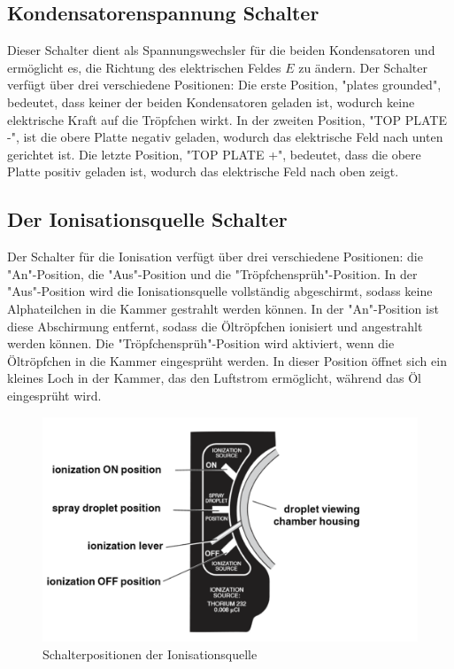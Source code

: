 \subsection{Kondensatorenspannung Schalter}\label{sub:Spannungsschalter}
Dieser Schalter dient als Spannungswechsler für die beiden Kondensatoren und ermöglicht es, die Richtung des elektrischen Feldes $E$ zu ändern. Der Schalter verfügt über drei verschiedene Positionen: Die erste Position, "plates grounded", bedeutet, dass keiner der beiden Kondensatoren geladen ist, wodurch keine elektrische Kraft auf die Tröpfchen wirkt. In der zweiten Position, "TOP PLATE -", ist die obere Platte negativ geladen, wodurch das elektrische Feld nach unten gerichtet ist. Die letzte Position, "TOP PLATE +", bedeutet, dass die obere Platte positiv geladen ist, wodurch das elektrische Feld nach oben zeigt.

\subsection{Der Ionisationsquelle Schalter}\label{sub:ionisationquelle}
Der Schalter für die Ionisation verfügt über drei verschiedene Positionen: die "An"-Position, die "Aus"-Position und die "Tröpfchensprüh"-Position. In der "Aus"-Position wird die Ionisationsquelle vollständig abgeschirmt, sodass keine Alphateilchen in die Kammer gestrahlt werden können. In der "An"-Position ist diese Abschirmung entfernt, sodass die Öltröpfchen ionisiert und angestrahlt werden können. Die "Tröpfchensprüh"-Position wird aktiviert, wenn die Öltröpfchen in die Kammer eingesprüht werden. In dieser Position öffnet sich ein kleines Loch in der Kammer, das den Luftstrom ermöglicht, während das Öl eingesprüht wird.

\begin{figure}[ht]
	\begin{center}
		\includegraphics[scale=0.5]{bilder/pdf/Schalterfunktionen.pdf}
		\caption{Schalterpositionen der Ionisationsquelle \parencite[6]{instructionManualHalogen}}
		\label{fig:Schalterpositionen}
	\end{center}
\end{figure}

